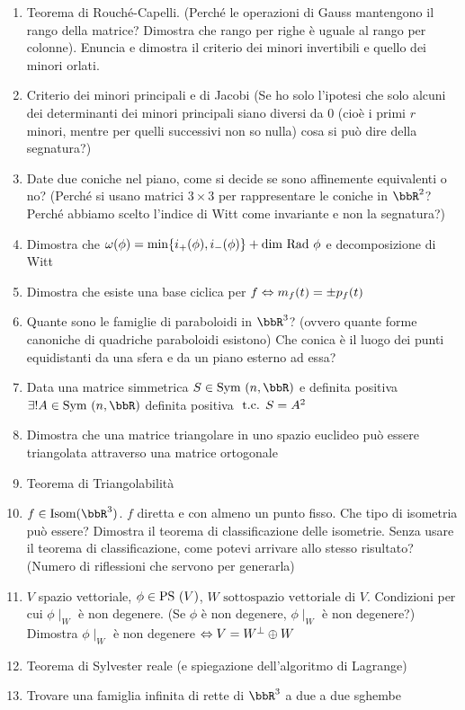 \documentclass[a4paper,NoNotes,GeneralMath]{stdmdoc}
\newcommand{\ssv}{\mbox{ sottospazio vettoriale di }}
\begin{document}
\begin{enumerate}
		\item Teorema di Rouché-Capelli. (Perché le operazioni di Gauss mantengono il rango della matrice? Dimostra che rango per righe è uguale al rango per colonne). Enuncia e dimostra il criterio dei minori invertibili e quello dei minori orlati.
		\item Criterio dei minori principali e di Jacobi (Se ho solo l'ipotesi che solo alcuni dei determinanti dei minori principali siano diversi da $0$ (cioè i primi $r$ minori, mentre per quelli successivi non so nulla) cosa si può dire della segnatura?)
		\item Date due coniche nel piano, come si decide se sono affinemente equivalenti o no? (Perché si usano matrici $3\times 3$ per rappresentare le coniche in $\bbR^2$? Perché abbiamo scelto l'indice di Witt come invariante e non la segnatura?)
		\item Dimostra che $\omega(\phi) = \min \{i_{+}(\phi), i_{-}(\phi)\} + \mbox{dim } \mbox{Rad } \phi$ e decomposizione di Witt
		\item Dimostra che esiste una base ciclica per $f \Leftrightarrow m_f(t) = \pm p_f(t)$
		\item Quante sono le famiglie di paraboloidi in $\bbR^3$? (ovvero quante forme canoniche di quadriche paraboloidi esistono) Che conica è il luogo dei punti equidistanti da una sfera e da un piano esterno ad essa?
		\item Data una matrice simmetrica $S \in \Symm(n,\bbR)$ e definita positiva $\exists ! A \in \Symm(n, \bbR)$ definita positiva $\mbox{ t.c. } S = A^2$
		\item Dimostra che una matrice triangolare in uno spazio euclideo può essere triangolata attraverso una matrice ortogonale
		\item Teorema di Triangolabilità
		\item $f \in \Isom(\bbR^3)$. $f$ diretta e con almeno un punto fisso. Che tipo di isometria può essere? Dimostra il teorema di classificazione delle isometrie. Senza usare il teorema di classificazione, come potevi arrivare allo stesso risultato? (Numero di riflessioni che servono per generarla)
		\item $V$ spazio vettoriale, $\phi \in \mbox{PS }(V)$, $W \ssv V$. Condizioni per cui $\phi\mid_W$ è non degenere. (Se $\phi$ è non degenere, $\phi\mid_W$ è non degenere?) Dimostra $\phi\mid_W$ è non degenere $\Leftrightarrow V = W^\bot \oplus W$
		\item Teorema di Sylvester reale (e spiegazione dell'algoritmo di Lagrange)
		\item Trovare una famiglia infinita di rette di $\bbR^3$ a due a due sghembe

\end{enumerate}
\end{document}
